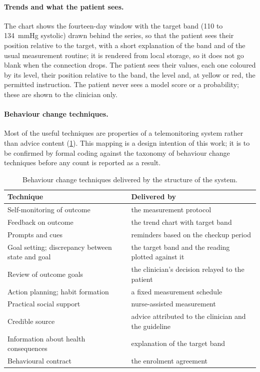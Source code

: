 \paragraph{Trends and what the patient sees.} The chart shows the fourteen-day window with the target band (110 to 134~mmHg systolic) drawn behind the series, so that the patient sees their position relative to the target, with a short explanation of the band and of the usual measurement routine; it is rendered from local storage, so it does not go blank when the connection drops. The patient sees their values, each one coloured by its level, their position relative to the band, the level and, at yellow or red, the permitted instruction. The patient never sees a model score or a probability; these are shown to the clinician only.

\paragraph{Behaviour change techniques.} Most of the useful techniques are properties of a telemonitoring system rather than advice content (\cref{tab:bct-mapping}). This mapping is a design intention of this work; it is to be confirmed by formal coding against the taxonomy of behaviour change techniques before any count is reported as a result.

\begin{table}[htbp]
\centering\small
\caption{Behaviour change techniques delivered by the structure of the system.}\label{tab:bct-mapping}
\begin{tabularx}{\textwidth}{@{}>{\raggedright\arraybackslash}p{6.0cm} X@{}}
\toprule
\textbf{Technique} & \textbf{Delivered by} \\
\midrule
Self-monitoring of outcome & the measurement protocol \\
Feedback on outcome & the trend chart with target band \\
Prompts and cues & reminders based on the checkup period \\
Goal setting; discrepancy between state and goal & the target band and the reading plotted against it \\
Review of outcome goals & the clinician's decision relayed to the patient \\
Action planning; habit formation & a fixed measurement schedule \\
Practical social support & nurse-assisted measurement \\
Credible source & advice attributed to the clinician and the guideline \\
Information about health consequences & explanation of the target band \\
Behavioural contract & the enrolment agreement \\
\bottomrule
\end{tabularx}
\end{table}

